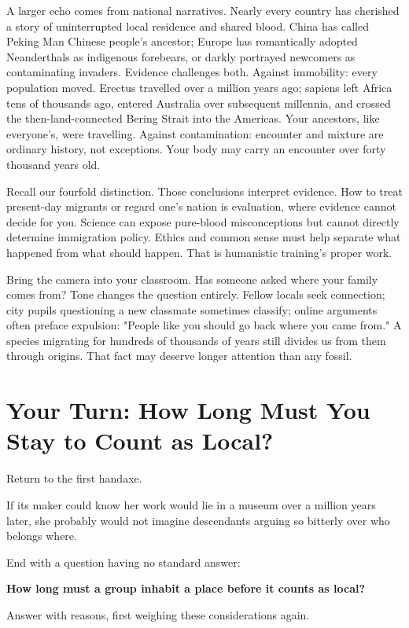 A larger echo comes from national narratives. Nearly every country has cherished a story of uninterrupted local residence and shared blood. China has called Peking Man Chinese people's ancestor; Europe has romantically adopted Neanderthals as indigenous forebears, or darkly portrayed newcomers as contaminating invaders. Evidence challenges both. Against immobility: every population moved. Erectus travelled over a million years ago; sapiens left Africa tens of thousands ago, entered Australia over subsequent millennia, and crossed the then-land-connected Bering Strait into the Americas. Your ancestors, like everyone's, were travelling. Against contamination: encounter and mixture are ordinary history, not exceptions. Your body may carry an encounter over forty thousand years old.

Recall our fourfold distinction. Those conclusions interpret evidence. How to treat present-day migrants or regard one's nation is evaluation, where evidence cannot decide for you. Science can expose pure-blood misconceptions but cannot directly determine immigration policy. Ethics and common sense must help separate what happened from what should happen. That is humanistic training's proper work.

Bring the camera into your classroom. Has someone asked where your family comes from? Tone changes the question entirely. Fellow locals seek connection; city pupils questioning a new classmate sometimes classify; online arguments often preface expulsion: "People like you should go back where you came from." A species migrating for hundreds of thousands of years still divides us from them through origins. That fact may deserve longer attention than any fossil.

\section[Your Turn: How Long Makes a Local?]{Your Turn: How Long Must You Stay to Count as Local?}
Return to the first handaxe.

If its maker could know her work would lie in a museum over a million years later, she probably would not imagine descendants arguing so bitterly over who belongs where.

End with a question having no standard answer:

\textbf{How long must a group inhabit a place before it counts as local?}

Answer with reasons, first weighing these considerations again.

